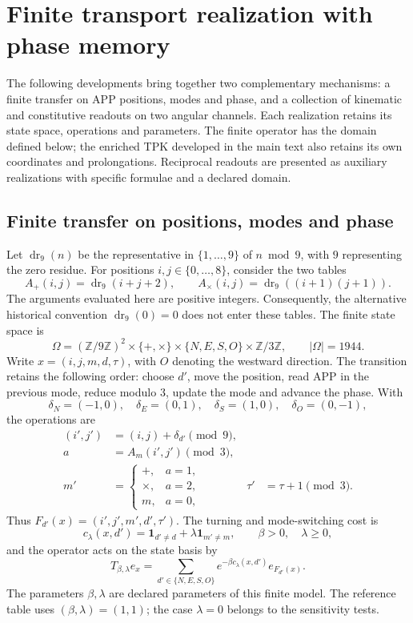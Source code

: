 \section{Finite transport realization with phase memory}
\label{iii:hist:antecedentes}

The following developments bring together two complementary mechanisms:
a finite transfer on APP positions, modes and phase, and a collection of
kinematic and constitutive readouts on two angular channels. Each
realization retains its state space, operations and parameters. The finite
operator has the domain defined below; the enriched TPK developed in the
main text also retains its own coordinates and prolongations. Reciprocal
readouts are presented as auxiliary realizations with specific formulae
and a declared domain.

\subsection{Finite transfer on positions, modes and phase}
\label{iii:hist:transferencia}

Let $\operatorname{dr}_9(n)$ be the representative in $\{1,\ldots,9\}$
of $n\bmod9$, with $9$ representing the zero residue. For positions
$i,j\in\{0,\ldots,8\}$, consider the two tables
\[
 A_+(i,j)=\operatorname{dr}_9(i+j+2),\qquad
 A_\times(i,j)=\operatorname{dr}_9((i+1)(j+1)).
\]
The arguments evaluated here are positive integers. Consequently, the
alternative historical convention $\operatorname{dr}_9(0)=0$ does not
enter these tables. The finite state space is
\[
 \Omega=(\mathbb Z/9\mathbb Z)^2\times\{+,\times\}
 \times\{N,E,S,O\}\times\mathbb Z/3\mathbb Z,
 \qquad |\Omega|=1944.
\]
Write $x=(i,j,m,d,\tau)$, with $O$ denoting the westward direction.
The transition retains the following order: choose $d'$, move the position,
read APP in the previous mode, reduce modulo $3$, update the mode and
advance the phase. With
\[
 \delta_N=(-1,0),\quad\delta_E=(0,1),\quad
 \delta_S=(1,0),\quad\delta_O=(0,-1),
\]
the operations are
\begin{align*}
 (i',j')&=(i,j)+\delta_{d'}\pmod9,\\
 a&=A_m(i',j')\pmod3,\\
 m'&=\begin{cases}+,&a=1,\\\times,&a=2,\\m,&a=0,\end{cases}
 &\tau'&=\tau+1\pmod3.
\end{align*}
Thus $F_{d'}(x)=(i',j',m',d',\tau')$. The turning and mode-switching cost is
\[
 c_\lambda(x,d')=\mathbf1_{d'\ne d}+\lambda\mathbf1_{m'\ne m},
 \qquad\beta>0,\quad\lambda\geq0,
\]
and the operator acts on the state basis by
\begin{equation}
 T_{\beta,\lambda}e_x
 =\sum_{d'\in\{N,E,S,O\}}
 e^{-\beta c_\lambda(x,d')}e_{F_{d'}(x)}.
 \label{iii:hist:T}
\end{equation}
The parameters $\beta,\lambda$ are declared parameters of this finite
model. The reference table uses $(\beta,\lambda)=(1,1)$; the case
$\lambda=0$ belongs to the sensitivity tests.

